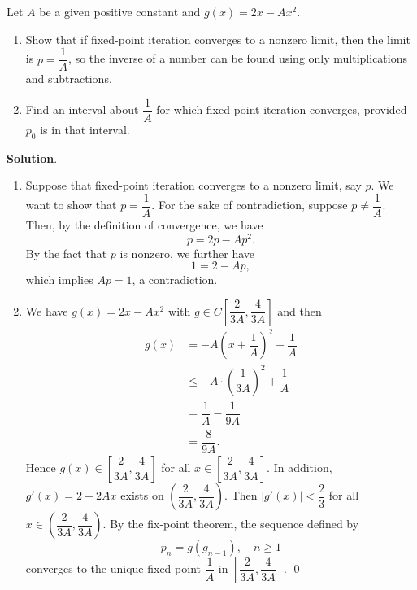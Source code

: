 \documentclass[11pt]{article}
\theoremstyle{break}
\numberwithin{equation}{theorem}
\begin{document}
\newpage
\begin{problem}\label{problem 5}
    Let $A$ be a given positive constant and $g(x)=2x-Ax^2$.
    \begin{enumerate}
        \item Show that if fixed-point iteration converges to a nonzero limit, then the limit is $p=\dfrac{1}{A}$, so the inverse of a number can be found using only multiplications and subtractions.
        \item Find an interval about $\dfrac{1}{A}$ for which fixed-point iteration converges, provided $p_0$ is in that interval.
    \end{enumerate}
\end{problem}
\textbf{Solution}.
\begin{enumerate}
    \item Suppose that fixed-point iteration converges to a nonzero limit, say $p$. We want to show that $p=\dfrac{1}{A}$. For the sake of contradiction, suppose $p\ne\dfrac{1}{A}$. Then, by the definition of convergence, we have 
    \begin{equation*}
        p=2p-Ap^2.
    \end{equation*}
    By the fact that $p$ is nonzero, we further have
    \begin{equation*}
        1=2-Ap,
    \end{equation*}
    which implies $Ap=1$, a contradiction.
    \item We have $g(x)=2x-Ax^2$ with $g\in C\left[\dfrac{2}{3A}, \dfrac{4}{3A}\right]$ and then
    \begin{align*}
        g(x)&=-A\left(x+\dfrac{1}{A}\right)^2+\dfrac{1}{A}\\
        &\leq-A\cdot\left(\dfrac{1}{3A}\right)^2+\dfrac{1}{A}\\
        &=\dfrac{1}{A}-\dfrac{1}{9A}\\
        &=\dfrac{8}{9A}.
    \end{align*}
    Hence $g(x)\in\left[\dfrac{2}{3A}, \dfrac{4}{3A}\right]$ for all $x\in\left[\dfrac{2}{3A}, \dfrac{4}{3A}\right]$. In addition, $g'(x)=2-2Ax$ exists on $\left(\dfrac{2}{3A}, \dfrac{4}{3A}\right)$. Then $|g'(x)|<\dfrac{2}{3}$ for all $x\in\left(\dfrac{2}{3A}, \dfrac{4}{3A}\right)$. By the fix-point theorem, the sequence defined by
    $$p_n=g(g_{n-1}),\quad n\geq 1$$ converges to the unique fixed point $\dfrac{1}{A}$ in $\left[\dfrac{2}{3A}, \dfrac{4}{3A}\right]$. \qed
\end{enumerate}
\end{document}
